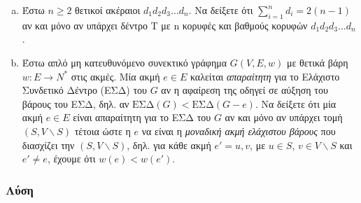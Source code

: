 \documentclass{assignment}
\begin{document}
\begin{enumerate}[(a)]

\item
Έστω $n \ge 2$ θετικοί ακέραιοι $d_1d_2d_3\dots d_n$. Να δείξετε ότι $\sum_{i=1}^{n} d_i = 2(n-1)$ αν και μόνο αν
υπάρχει δέντρο T με n κορυφές και βαθμούς κορυφών $d_1d_2d_3\dots d_n$.

\item
Έστω απλό μη κατευθυνόμενο συνεκτικό γράφημα $G(V, E, w)$ με θετικά βάρη $w : E \rightarrow N^{*} $ στις ακμές. Μία ακμή
$e \in E$ καλείται {\it απαραίτητη} για το Ελάχιστο Συνδετικό Δέντρο (ΕΣΔ) του $G$ αν η αφαίρεση της οδηγεί σε αύξηση
του βάρους του ΕΣΔ, δηλ. αν $\text{ΕΣΔ}(G) < \text{ΕΣΔ}(G-e)$. Να δείξετε ότι μία ακμή $e \in E$ είναι απαραίτητη για το ΕΣΔ του $G$ 
αν και μόνο αν υπάρχει τομή $(S, V \backslash S)$ τέτοια ώστε η $e$ να είναι η {\it μοναδική ακμή ελάχιστου βάρους} που διασχίζει 
την $(S, V \backslash S)$, δηλ. για κάθε ακμή $e' = {u, v}$, με $u \in S$, $v \in V \backslash S$ και $e' \neq e$, έχουμε ότι
$w(e) < w(e')$.

\end{enumerate}

\subsubsection*{Λύση}
\end{document}
